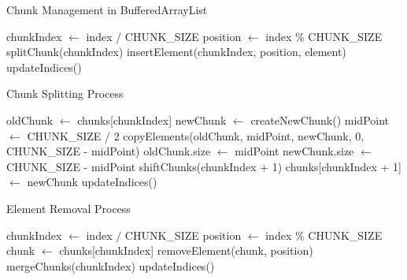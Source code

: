 \begin{algorithm}[t]
\caption{Chunk Management in BufferedArrayList}
\begin{algorithmic}[1]
    \State chunkIndex $\gets$ index / CHUNK\_SIZE
    \State position $\gets$ index \% CHUNK\_SIZE
        \State splitChunk(chunkIndex)
    \EndIf
    \State insertElement(chunkIndex, position, element)
    \State updateIndices()
\EndProcedure
\end{algorithmic}
\label{alg:insert}
\end{algorithm}

\begin{algorithm}[t]
\caption{Chunk Splitting Process}
\begin{algorithmic}[1]
    \State oldChunk $\gets$ chunks[chunkIndex]
    \State newChunk $\gets$ createNewChunk()
    \State midPoint $\gets$ CHUNK\_SIZE / 2
    \State copyElements(oldChunk, midPoint, newChunk, 0, CHUNK\_SIZE - midPoint)
    \State oldChunk.size $\gets$ midPoint
    \State newChunk.size $\gets$ CHUNK\_SIZE - midPoint
    \State shiftChunks(chunkIndex + 1)
    \State chunks[chunkIndex + 1] $\gets$ newChunk
    \State updateIndices()
\EndProcedure
\end{algorithmic}
\label{alg:split}
\end{algorithm}

\begin{algorithm}[t]
\caption{Element Removal Process}
\begin{algorithmic}[1]
    \State chunkIndex $\gets$ index / CHUNK\_SIZE
    \State position $\gets$ index \% CHUNK\_SIZE
    \State chunk $\gets$ chunks[chunkIndex]
    \State removeElement(chunk, position)
        \State mergeChunks(chunkIndex)
    \EndIf
    \State updateIndices()
\EndProcedure
\end{algorithmic}
\label{alg:remove}
\end{algorithm} 